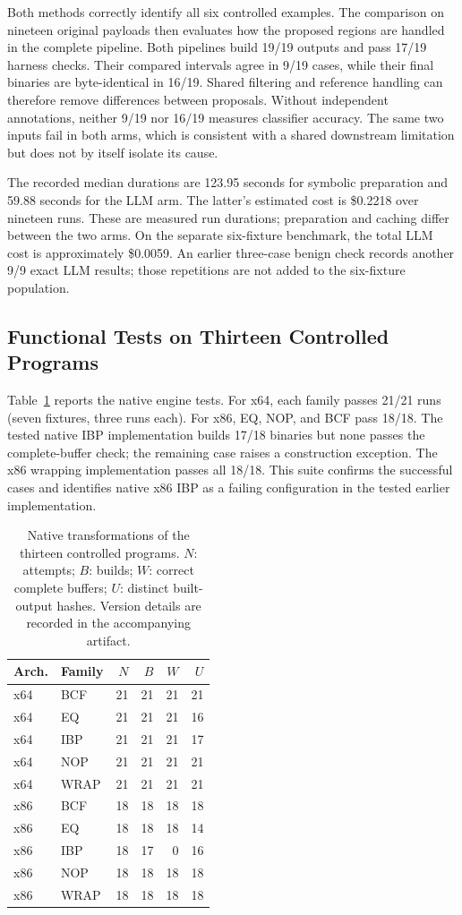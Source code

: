 Both methods correctly identify all six controlled examples. The
comparison on nineteen original payloads then evaluates how the proposed
regions are handled in the complete pipeline. Both pipelines build 19/19 outputs and pass
17/19 harness checks. Their compared intervals agree in 9/19 cases,
while their final binaries are byte-identical in 16/19. Shared filtering
and reference handling can therefore remove differences between proposals.
Without independent annotations, neither 9/19 nor 16/19 measures classifier
accuracy. The same two inputs fail in both arms, which is consistent with
a shared downstream limitation but does not by itself isolate its cause.

The recorded median durations are 123.95 seconds for symbolic preparation
and 59.88 seconds for the LLM arm. The latter's estimated cost is \$0.2218
over nineteen runs. These are measured run durations; preparation and caching differ
between the two arms. On the separate six-fixture benchmark,
the total LLM cost is approximately \$0.0059. An earlier three-case benign
check records another 9/9 exact LLM results; those repetitions are not
added to the six-fixture population.

\subsection{Functional Tests on Thirteen Controlled Programs}
Table~\ref{tab:new_native} reports the native engine tests. For x64, each
family passes 21/21 runs (seven fixtures, three runs each). For x86, EQ,
NOP, and BCF pass 18/18. The tested native IBP implementation builds 17/18 binaries but none passes the
complete-buffer check; the remaining case raises a construction exception.
The x86 wrapping implementation passes all 18/18. This suite confirms the successful cases and identifies native x86
IBP as a failing configuration in the tested earlier implementation.


\begin{table}[t]
\caption{Native transformations of the thirteen controlled programs. $N$: attempts; $B$: builds;
$W$: correct complete buffers; $U$: distinct built-output hashes.
Version details are recorded in the accompanying artifact.}
\label{tab:new_native}
\centering\small
\begin{tabular}{@{}llrrrr@{}}
\toprule
Arch. & Family & $N$ & $B$ & $W$ & $U$ \\
\midrule
x64 & BCF & 21 & 21 & 21 & 21 \\
x64 & EQ & 21 & 21 & 21 & 16 \\
x64 & IBP & 21 & 21 & 21 & 17 \\
x64 & NOP & 21 & 21 & 21 & 21 \\
x64 & WRAP & 21 & 21 & 21 & 21 \\
x86 & BCF & 18 & 18 & 18 & 18 \\
x86 & EQ & 18 & 18 & 18 & 14 \\
x86 & IBP & 18 & 17 & 0 & 16 \\
x86 & NOP & 18 & 18 & 18 & 18 \\
x86 & WRAP & 18 & 18 & 18 & 18 \\
\bottomrule
\end{tabular}
\end{table}


